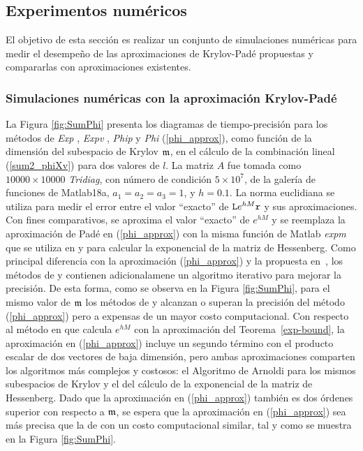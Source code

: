 \subsection{Experimentos numéricos}\label{section:num-sim-kp}
El objetivo de esta sección es realizar un conjunto de simulaciones numéricas para medir el desempeño de las aproximaciones de Krylov-Padé propuestas y compararlas con aproximaciones existentes.


\subsubsection{Simulaciones numéricas con la aproximación Krylov-Padé}
La Figura \ref{fig:SumPhi} presenta los diagramas de tiempo-precisión para los métodos de \textit{Exp} \cite{hochbruck1997krylov}, \textit{Expv} \cite{sidje1998expokit}, \textit{Phip} \cite{niesen2012algorithm} y \textit{Phi} (\ref{phi_approx}), como función de la dimensión del subespacio de Krylov $\mathfrak{m}$, en el cálculo de la combinación lineal (\ref{sum2_phiXv}) para dos valores de $l$. La matriz $A$ fue tomada como $10000 \times 10000$ \textit{Tridiag}, con número de condición $5\times 10^{7}$, de la galería de funciones de Matlab18a, $a_1=a_2=a_3=1$, y $h=0$.$1$. La norma euclidiana se utiliza para medir el error entre el valor ``exacto'' de $\mathtt{L} e^{h M}\mathtt{r}$ y sus aproximaciones. Con fines comparativos, se aproxima el valor ``exacto'' de $e^{h M}$ y se reemplaza la aproximación de Padé en (\ref{phi_approx}) con la misma función de Matlab \textit{expm} que se utiliza en \cite{sidje1998expokit} y \cite{niesen2012algorithm} para calcular la exponencial de la matriz de Hessenberg. Como principal diferencia con la aproximación (\ref{phi_approx}) y la propuesta en~\cite{hochbruck1997krylov}, los métodos de \cite{sidje1998expokit} y \cite{niesen2012algorithm} contienen adicionalamene un algoritmo iterativo para mejorar la precisión. De esta forma, como se observa en la Figura \ref{fig:SumPhi}, para el mismo valor de $\mathfrak{m}$ los métodos de \cite{sidje1998expokit} y \cite{niesen2012algorithm} alcanzan o superan la precisión del método (\ref{phi_approx}) pero a expensas de un mayor costo computacional. Con respecto al método en \cite{hochbruck1997krylov} que calcula $e^{h M}$ con la aproximación del Teorema~\ref{exp-bound}, la aproximación en (\ref{phi_approx}) incluye un segundo término con el producto escalar de dos vectores de baja dimensión, pero ambas aproximaciones comparten los  algoritmos más complejos y costosos: el Algoritmo de Arnoldi para los mismos subespacios de Krylov y el del cálculo de la exponencial de la  matriz de Hessenberg. Dado que la aproximación en (\ref{phi_approx}) también es dos órdenes superior con respecto a $\mathfrak{m}$, se espera que la aproximación en (\ref{phi_approx}) sea más precisa que la de \cite{hochbruck1997krylov} con un costo computacional similar, tal y como se muestra en la Figura \ref{fig:SumPhi}.

